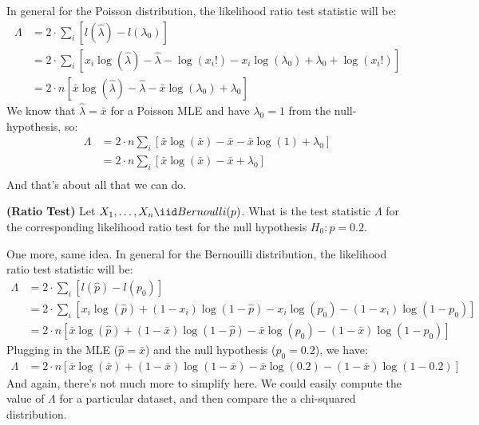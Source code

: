In general for the Poisson distribution, the likelihood ratio test statistic
will be:
\begin{align*}
\Lambda &= 2 \cdot \sum_i \left[ l(\hat{\lambda}) - l(\lambda_0)  \right] \\
&= 2 \cdot \sum_i \left[ x_i \log(\hat{\lambda}) - \hat{\lambda} - \log(x_i!) - 
                         x_i \log(\lambda_0) + \lambda_0 + \log(x_i!)  \right] \\
&= 2 \cdot n \left[ \bar{x} \log(\hat{\lambda}) - \hat{\lambda} - \bar{x} \log(\lambda_0) + \lambda_0 \right] 
\end{align*}
We know that $\hat{\lambda} = \bar{x}$ for a Poisson MLE and have $\lambda_0 = 1$
from the null-hypothesis, so:
\begin{align*}
\Lambda
&= 2 \cdot n \sum_i \left[ \bar{x} \log(\bar{x}) - \bar{x} - \bar{x} \log(1) + \lambda_0 \right] \\ 
&= 2 \cdot n \sum_i \left[ \bar{x} \log(\bar{x}) - \bar{x} + \lambda_0 \right] \\ 
\end{align*}
And that's about all that we can do. 


\textbf{(Ratio Test)} Let $X_1, \ldots, X_n \iid Bernoulli(p)$.
What is the test statistic $\Lambda$ for the corresponding likelihood 
ratio test for the null hypothesis $H_0: p = 0.2$.


One more, same idea. In general for the Bernouilli distribution, the likelihood
ratio test statistic will be:
\begin{align*}
\Lambda
&= 2 \cdot \sum_i \left[ l(\hat{p}) - l(p_0)  \right] \\
&= 2 \cdot \sum_i \left[ x_i \log(\hat{p}) + (1-x_i) \log(1 - \hat{p}) -
                         x_i \log(p_0) - (1-x_i) \log(1 - p_0) \right] \\
&= 2 \cdot n \left[ \bar{x} \log(\hat{p}) + (1-\bar{x}) \log(1 - \hat{p}) -
                    \bar{x} \log(p_0) - (1-\bar{x}) \log(1 - p_0) \right]                       
\end{align*}
Plugging in the MLE ($\hat{p} = \bar{x}$) and the null hypothesis ($p_0 = 0.2$),
we have:
\begin{align*}
\Lambda
&= 2 \cdot n \left[ \bar{x} \log(\bar{x}) + (1-\bar{x}) \log(1 - \bar{x}) -
                    \bar{x} \log(0.2) - (1-\bar{x}) \log(1 - 0.2) \right]                       
\end{align*}
And again, there's not much more to simplify here. We could easily compute
the value of $\Lambda$ for a particular dataset, and then compare the a 
chi-squared distribution.

